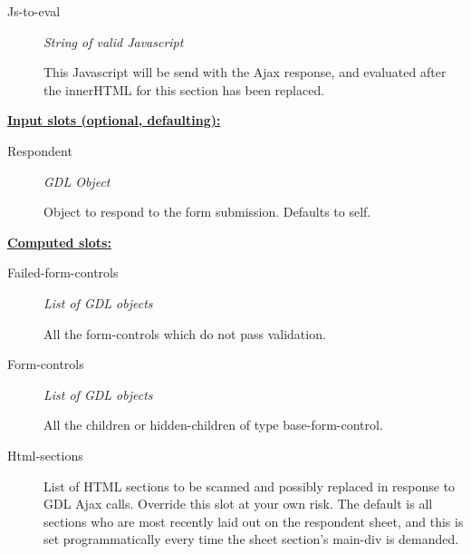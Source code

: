 \documentclass [11pt]{book}
\begin{document}
\begin{itemize}
\begin{description}
\item [Js-to-eval]
\emph{String of valid Javascript}

 This Javascript will be send with the Ajax response,
and evaluated after the innerHTML for this section has been replaced.




\end{description}






\textbf{
\underline{Input slots (optional, defaulting):}}

\begin{description}

\item [Respondent]
\emph{GDL Object}

 Object to respond to the form submission. Defaults to self.




\end{description}






\textbf{
\underline{Computed slots:}}

\begin{description}

\item [Failed-form-controls]
\emph{List of GDL objects}

 All the form-controls which do not pass validation.




\item [Form-controls]
\emph{List of GDL objects}

 All the children or hidden-children
of type base-form-control.




\item [Html-sections]

List of HTML sections to be scanned and possibly replaced in response to
GDL Ajax calls. Override this slot at your own risk. The default is all
sections who are most recently laid out on the respondent sheet, and
this is set programmatically every time the sheet section's main-div
is demanded.





\end{description}
\end{itemize}
\end{document}
